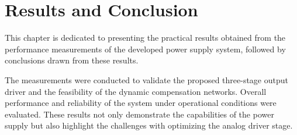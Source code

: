 

\chapter{Results and Conclusion}
\label{ch:tests-and-conclusions}

This chapter is dedicated to presenting the practical results obtained from the
performance measurements of the developed power supply system,
followed by conclusions drawn from these results.

The measurements were conducted to validate the proposed three-stage
output driver and the feasibility of the dynamic compensation networks.
Overall performance and reliability of the system under operational
conditions were evaluated. These results not only demonstrate the
capabilities of the power supply but also highlight the challenges with
optimizing the analog driver stage.





